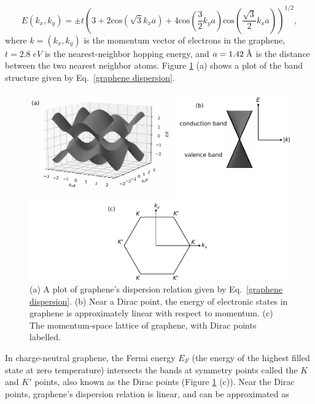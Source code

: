 \documentclass[double,12pt,1in,seploa]{beavtex}
\begin{document}
\begin{equation}
    E(k_x, k_y) = \pm t  \left(3 + 2\mathrm{cos}(\sqrt{3}k_x a) + 4\mathrm{cos}(\frac{3}{2}k_y a)\mathrm{cos}(\frac{\sqrt{3}}{2}k_x a)\right)^{1/2}, \label{graphene dispersion}
\end{equation}
where $k = (k_x, k_y)$ is the momentum vector of electrons in the graphene, $t = 2.8 \; eV$ is the nearest-neighbor hopping energy, and $a = 1.42 \;\SIUnitSymbolAngstrom$ is the distance between the two nearest neighbor atoms. Figure \ref{graphene dispersion plot} (a) shows a plot of the band structure given by Eq.\ \ref{graphene dispersion}.


\begin{figure}
    \includegraphics[width = 1\textwidth]{Graphene band structure 3D.pdf}
    \caption{(a) A plot of graphene's dispersion relation given by Eq.\ \ref{graphene dispersion}. (b) Near a Dirac point, the energy of electronic states in graphene is approximately linear with respect to momentum. (c) The momentum-space lattice of graphene, with Dirac points labelled.}
    \label{graphene dispersion plot}
\end{figure}
In charge-neutral graphene, the Fermi energy $E_F$ (the energy of the highest filled state at zero temperature) intersects the bands at symmetry points called the $K$ and $K'$ points, also known as the Dirac points (Figure \ref{graphene dispersion plot} (c)). Near the Dirac points, graphene's dispersion relation is linear, and can be approximated as

\end{document}
